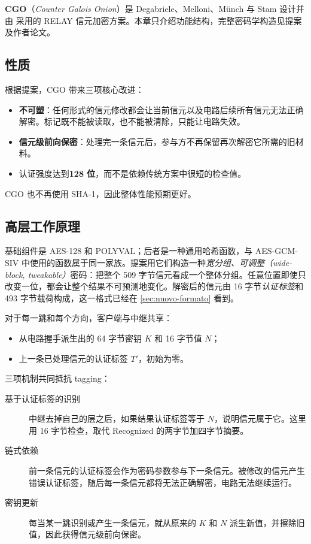 \textbf{CGO}（\emph{Counter Galois Onion}）是 Degabriele、Melloni、Münch 与 Stam 设计并由  采用的 RELAY 信元加密方案。本章只介绍功能结构，完整密码学构造见提案及作者论文。

\subsection{性质}

根据提案，CGO 带来三项核心改进：
\begin{itemize}
  \item \textbf{不可塑}：任何形式的信元修改都会让当前信元以及电路后续所有信元无法正确解密。标记既不能被读取，也不能被清除，只能让电路失效。
  \item \textbf{信元级前向保密}：处理完一条信元后，参与方不再保留再次解密它所需的旧材料。
  \item 认证强度达到\textbf{128 位}，而不是依赖传统方案中很短的检查值。
\end{itemize}

CGO 也不再使用 SHA-1，因此整体性能预期更好。

\subsection{高层工作原理}

基础组件是 AES-128 和 POLYVAL；后者是一种通用哈希函数，与 AES-GCM-SIV 中使用的函数属于同一家族。提案用它们构造一种\emph{宽分组、可调整（wide-block, tweakable）}密码：把整个 509 字节信元看成一个整体分组。任意位置即使只改变一位，都会让整个结果不可预测地变化。解密后的信元由 16 字节\emph{认证标签}和 493 字节载荷构成，这一格式已经在 \cref{sec:nuovo-formato} 看到。

对于每一跳和每个方向，客户端与中继共享：
\begin{itemize}
  \item 从电路握手派生出的 64 字节密钥 $K$ 和 16 字节值 $N$；
  \item 上一条已处理信元的认证标签 $T'$，初始为零。
\end{itemize}

三项机制共同抵抗 tagging：
\begin{description}
  \item[基于认证标签的识别] 中继去掉自己的层之后，如果结果认证标签等于 $N$，说明信元属于它。这里用 16 字节检查，取代 Recognized 的两字节加四字节摘要。
  \item[链式依赖] 前一条信元的认证标签会作为密码参数参与下一条信元。被修改的信元产生错误认证标签，随后每一条信元都将无法正确解密，电路无法继续运行。
  \item[密钥更新] 每当某一跳识别或产生一条信元，就从原来的 $K$ 和 $N$ 派生新值，并擦除旧值，因此获得信元级前向保密。
\end{description}

